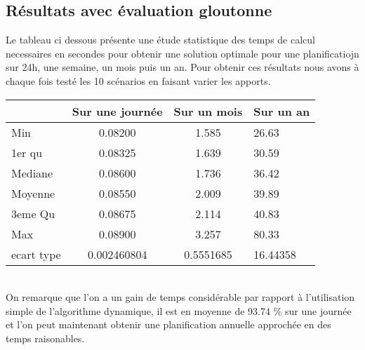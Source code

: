 \documentclass[a4paper]{report}
\begin{document}
\subsection{Résultats avec évaluation gloutonne}
Le tableau ci dessous présente une étude statistique des temps de calcul necessaires en secondes pour obtenir une solution optimale pour une planificatiojn sur 24h, une semaine, un mois puis un an. Pour obtenir ces résultats nous avons à chaque fois testé les 10 scénarios en faisant varier les apports.\\
\begin{tabular}{|l|c|c|l|}
  \hline
  &Sur une journée&Sur un mois&Sur un an\\
  \hline
  Min &0.08200 &1.585&26.63\\
  \hline
  1er qu & 0.08325 & 1.639 &30.59
\\
  \hline
  Mediane & 0.08600&1.736 &36.42
\\
  \hline
  Moyenne &0.08550 & 2.009 &39.89
\\
  \hline
  3eme Qu &0.08675&2.114&40.83\\
  \hline
  Max & 0.08900 &3.257&80.33\\
\hline
 ecart type & 0.002460804 & 0.5551685 &16.44358\\
 
  \hline
\end{tabular}
\\
On remarque que l'on a un gain de temps considérable par rapport à l'utilisation simple de l'algorithme dynamique, il est en moyenne de 93.74 $\%$ sur une journée et l'on peut maintenant obtenir une planification annuelle approchée en des temps raisonables.
\end{document}

